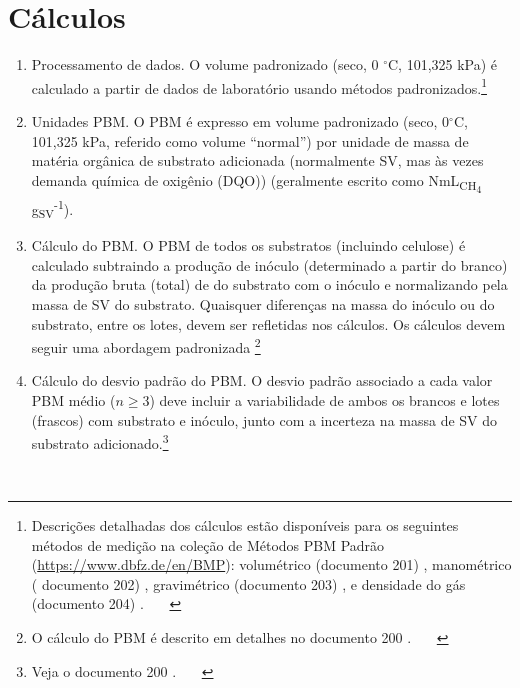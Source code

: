 \documentclass[]{article}
\begin{document}
\section{Cálculos}
\label{sec:calculations}
\begin{enumerate}
  \item Processamento de dados. 
        O volume  padronizado (seco, 0 $^\circ$C, 101,325 kPa) é calculado a partir de dados de laboratório usando métodos padronizados.\footnote{
          Descrições detalhadas dos cálculos estão disponíveis para os seguintes métodos de medição na coleção de Métodos PBM Padrão (\url{https://www.dbfz.de/en/BMP}): volumétrico (documento 201) \citep{BMPdoc201vol}, manométrico ( documento 202) \citep{BMPdoc202man}, gravimétrico (documento 203) \citep{BMPdoc203grav}, e densidade do gás (documento 204) \citep{BMPdoc204gasdens}.
        }
  \item Unidades PBM.
        O PBM é expresso em volume  padronizado (seco, 0$^\circ$C, 101,325 kPa, referido como volume ``normal'') por unidade de massa de matéria orgânica de substrato adicionada (normalmente SV, mas às vezes demanda química de oxigênio (DQO)) (geralmente escrito como NmL\textsubscript{CH\textsubscript{4}} g\textsubscript{SV}\textsuperscript{-1}).
  \item Cálculo do PBM.
        O PBM de todos os substratos (incluindo celulose) é calculado subtraindo a produção de inóculo  (determinado a partir do branco) da produção bruta (total) de  do substrato com o inóculo e normalizando pela massa de SV do substrato.
        Quaisquer diferenças na massa do inóculo ou do substrato, entre os lotes, devem ser refletidas nos cálculos.
        Os cálculos devem seguir uma abordagem padronizada \footnote{
        O cálculo do PBM é descrito em detalhes no documento 200 \citep{BMPdoc200BMP}.
    }
  \item Cálculo do desvio padrão do PBM.
        O desvio padrão associado a cada valor PBM médio ($n \ge 3$) deve incluir a variabilidade de ambos os brancos e lotes (frascos) com substrato e inóculo, junto com a incerteza na massa de SV do substrato adicionado.\footnote{
          Veja o documento 200 \citep{BMPdoc200BMP}. 
        }
\end{enumerate}
 
\end{document}

